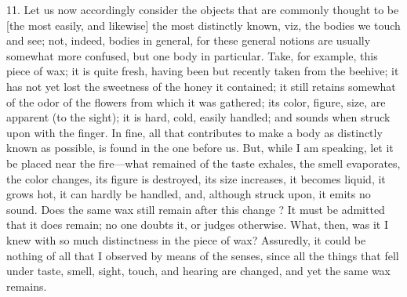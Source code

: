 11. Let us now accordingly consider the objects that are commonly thought to be [the most easily, and likewise] the most distinctly known, viz, the bodies we touch and see; not, indeed, bodies in general, for these general notions are usually somewhat more confused, but one body in particular. Take, for example, this piece of wax; it is quite fresh, having been but recently taken from the beehive; it has not yet lost the sweetness of the honey it contained; it still retains somewhat of the odor of the flowers from which it was gathered; its color, figure, size, are apparent (to the sight); it is hard, cold, easily handled; and sounds when struck upon with the finger. In fine, all that contributes to make a body as distinctly known as possible, is found in the one before us. But, while I am speaking, let it be placed near the fire—what remained of the taste exhales, the smell evaporates, the color changes, its figure is destroyed, its size increases, it becomes liquid, it grows hot, it can hardly be handled, and, although struck upon, it emits no sound. Does the same wax still remain after this change ? It must be admitted that it does remain; no one doubts it, or judges otherwise. What, then, was it I knew with so much distinctness in the piece of wax? Assuredly, it could be nothing of all that I observed by means of the senses, since all the things that fell under taste, smell, sight, touch, and hearing are changed, and yet the same wax remains.

